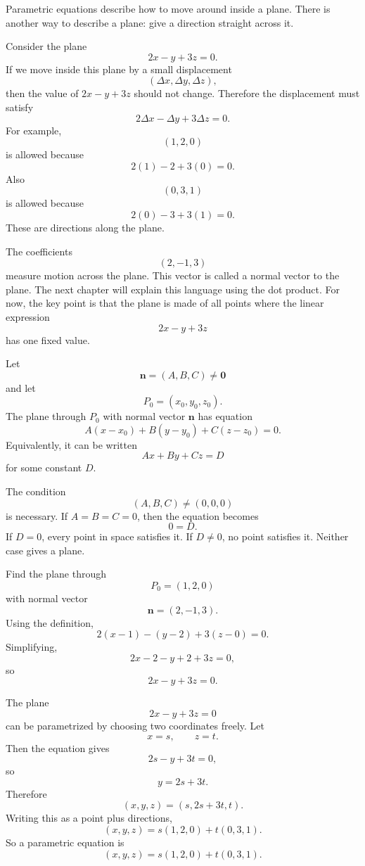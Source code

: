 Parametric equations describe how to move around inside a plane.  There is another
way to describe a plane: give a direction straight across it.

Consider the plane
\[
    2x-y+3z=0.
\]
If we move inside this plane by a small displacement
\[
    (\Delta x,\Delta y,\Delta z),
\]
then the value of \(2x-y+3z\) should not change.  Therefore the displacement must
satisfy
\[
    2\Delta x-\Delta y+3\Delta z=0.
\]
For example,
\[
    (1,2,0)
\]
is allowed because
\[
    2(1)-2+3(0)=0.
\]
Also
\[
    (0,3,1)
\]
is allowed because
\[
    2(0)-3+3(1)=0.
\]
These are directions along the plane.

The coefficients
\[
    (2,-1,3)
\]
measure motion across the plane.  This vector is called a normal vector to the plane.
The next chapter will explain this language using the dot product.  For now, the key
point is that the plane is made of all points where the linear expression
\[
    2x-y+3z
\]
has one fixed value.

\begin{definition}
Let
\[
    \mathbf n=(A,B,C)\neq \mathbf 0
\]
and let
\[
    P_0=(x_0,y_0,z_0).
\]
The plane through \(P_0\) with normal vector \(\mathbf n\) has equation
\[
    A(x-x_0)+B(y-y_0)+C(z-z_0)=0.
\]
Equivalently, it can be written
\[
    Ax+By+Cz=D
\]
for some constant \(D\).
\end{definition}

The condition
\[
    (A,B,C)\neq (0,0,0)
\]
is necessary.  If \(A=B=C=0\), then the equation becomes
\[
    0=D.
\]
If \(D=0\), every point in space satisfies it.  If \(D\neq0\), no point satisfies it.
Neither case gives a plane.

\begin{example}
Find the plane through
\[
    P_0=(1,2,0)
\]
with normal vector
\[
    \mathbf n=(2,-1,3).
\]
Using the definition,
\[
    2(x-1)-(y-2)+3(z-0)=0.
\]
Simplifying,
\[
    2x-2-y+2+3z=0,
\]
so
\[
    2x-y+3z=0.
\]
\end{example}

\begin{example}
The plane
\[
    2x-y+3z=0
\]
can be parametrized by choosing two coordinates freely.  Let
\[
    x=s,\qquad z=t.
\]
Then the equation gives
\[
    2s-y+3t=0,
\]
so
\[
    y=2s+3t.
\]
Therefore
\[
    (x,y,z)=(s,2s+3t,t).
\]
Writing this as a point plus directions,
\[
    (x,y,z)
    =
    s(1,2,0)+t(0,3,1).
\]
So a parametric equation is
\[
    (x,y,z)=s(1,2,0)+t(0,3,1).
\]
\end{example}

